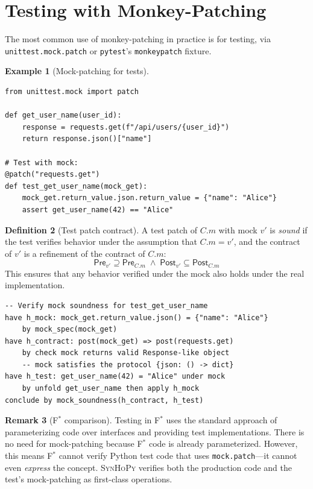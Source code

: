 \documentclass[11pt,a4paper]{report}
\theoremstyle{definition}
\newtheorem{definition}{Definition}[chapter]
\newtheorem{example}[definition]{Example}
\newtheorem{remark}[definition]{Remark}
\theoremstyle{plain}
\newcommand{\Pre}{\mathsf{Pre}}
\newcommand{\Post}{\mathsf{Post}}
\newcommand{\fstar}{F$^{*}$}
\newcommand{\synhopy}{\textsc{SynHoPy}}
\begin{document}
\section{Testing with Monkey-Patching}
\label{sec:test-monkey}

The most common use of monkey-patching in practice is for testing, via
\texttt{unittest.mock.patch} or \texttt{pytest}'s \texttt{monkeypatch} fixture.

\begin{example}[Mock-patching for tests]
\begin{lstlisting}[style=python]
from unittest.mock import patch

def get_user_name(user_id):
    response = requests.get(f"/api/users/{user_id}")
    return response.json()["name"]

# Test with mock:
@patch("requests.get")
def test_get_user_name(mock_get):
    mock_get.return_value.json.return_value = {"name": "Alice"}
    assert get_user_name(42) == "Alice"
\end{lstlisting}
\end{example}

\begin{definition}[Test patch contract]
A test patch of $C.m$ with mock $v'$ is \emph{sound} if the test verifies
behavior under the assumption that $C.m = v'$, and the contract of $v'$
is a refinement of the contract of $C.m$:
\[
  \Pre_{v'} \supseteq \Pre_{C.m} \;\wedge\; \Post_{v'} \subseteq \Post_{C.m}
\]
This ensures that any behavior verified under the mock also holds under the
real implementation.
\end{definition}

\begin{lstlisting}[style=proof]
-- Verify mock soundness for test_get_user_name
have h_mock: mock_get.return_value.json() = {"name": "Alice"}
    by mock_spec(mock_get)
have h_contract: post(mock_get) => post(requests.get)
    by check mock returns valid Response-like object
    -- mock satisfies the protocol {json: () -> dict}
have h_test: get_user_name(42) = "Alice" under mock
    by unfold get_user_name then apply h_mock
conclude by mock_soundness(h_contract, h_test)
\end{lstlisting}

\begin{remark}[\fstar{} comparison]
Testing in \fstar{} uses the standard approach of parameterizing code over
interfaces and providing test implementations. There is no need for mock-patching
because \fstar{} code is already parameterized. However, this means \fstar{}
cannot verify Python test code that uses \texttt{mock.patch}---it cannot even
\emph{express} the concept. \synhopy{} verifies both the production code and
the test's mock-patching as first-class operations.
\end{remark}
\end{document}
